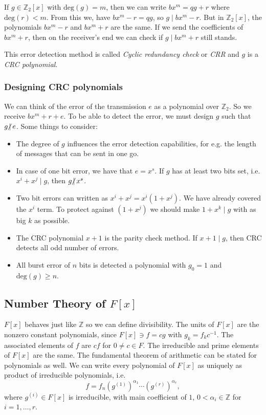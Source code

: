 \documentclass{article}
\newcommand{\Z}{\mathbb{Z}}
\newcommand{\nmid}{\hspace{-4pt}\not|\hspace{2pt}}
\begin{document}
If $g \in \Z_2[x]$ with $\mathrm{deg}(g) = m$, then we can write $b x^m = qg + r$ where $\mathrm{deg}(r) < m$.
From this we, have $b x^m - r = qg$, so $g \mid b x^m - r$. But in $\Z_2[x]$, the polynomials $b x^m - r$ and $b x^m + r$ are the same.
If we send the coefficients of $b x^m + r$, then on the receiver's end we can check if $g \mid b x^m + r$ still stands.

This error detection method is called \emph{Cyclic redundancy check} or \emph{CRR} and $g$ is a \emph{CRC polynomial}.

\subsubsection{Designing CRC polynomials}

We can think of the error of the transmission $e$ as a polynomial over $\Z_2$.
So we receive $bx^m + r + e$. To be able to detect the error, we must design $g$ such that $g \nmid e$.
Some things to consider:
\begin{itemize}
    \item The degree of $g$ influences the error detection capabilities, for e.g. the length of messages that can be sent in one go.
    \item In case of one bit error, we have that $e=x^s$. If $g$ has at least two bits set, i.e. $x^i + x^j \mid g$, then $g \nmid x^s$.
    \item Two bit errors can written as $x^i + x^j = x^i(1 + x^j)$. We have already covered the $x^i$ term.
          To protect against $(1 + x^j)$ we should make $1 + x^k \mid g$ with as big $k$ as possible.
    \item The CRC polynomial $x+1$ is the parity check method. If $x + 1 \mid g$, then CRC detects all odd number of errors.
    \item All burst error of $n$ bits is detected a polynomial with $g_0 = 1$ and $\mathrm{deg}(g) \ge n$.
\end{itemize}

\subsection{Number Theory of $F[x]$}

$F[x]$ behaves just like $\Z$ so we can define divisibility.
The units of $F[x]$ are the nonzero constant polynomials, since $F[x] \ni f = cg$ with $g_k = f_k c^{-1}$.
The associated elements of $f$ are $cf$ for $0 \neq c \in F$.
The irreducible and prime elements of $F[x]$ are the same. The fundamental theorem of arithmetic can be stated for polynomials as well.
We can write every polynomial of $F[x]$ as uniquely as product of irreducible polynomials, i.e. 
\[
    f = f_n\left(g^{(1)}\right)^{\alpha_1}\cdots \left(g^{(r)}\right)^{\alpha_r},
\]
where $g^{(i)} \in F[x]$ is irreducible, with main coefficient of $1$, $0 < \alpha_i \in \Z$ for $i=1,\ldots,r$.
\end{document}
